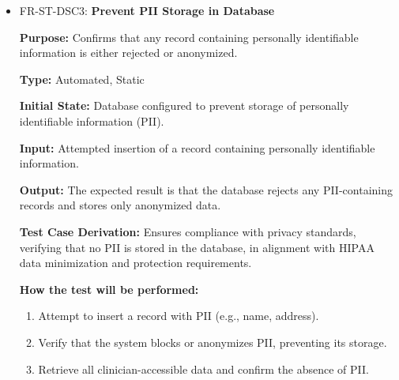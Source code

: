 \documentclass[12pt, titlepage]{article}
\begin{document}
\begin{itemize}
  \item FR-ST-DSC3: \textbf{Prevent PII Storage in Database}
  \begin{mdframed}[linewidth=0.5mm]
      \textbf{Purpose:} Confirms that any record containing personally identifiable information is either rejected or anonymized. \par
      \textbf{Type:} Automated, Static \par
      \textbf{Initial State:} Database configured to prevent storage of personally identifiable information (PII). \par
      \textbf{Input:} Attempted insertion of a record containing personally identifiable information. \par
      \textbf{Output:} The expected result is that the database rejects any PII-containing records and stores only anonymized data. \par
      \textbf{Test Case Derivation:} Ensures compliance with privacy standards, verifying that no PII is stored in the database, in alignment with HIPAA data minimization and protection requirements. \par
      \textbf{How the test will be performed:}
      \begin{enumerate}[noitemsep]
        \item Attempt to insert a record with PII (e.g., name, address).
        \item Verify that the system blocks or anonymizes PII, preventing its storage.
        \item Retrieve all clinician-accessible data and confirm the absence of PII.
      \end{enumerate}
  \end{mdframed}


\end{itemize}
\end{document}

